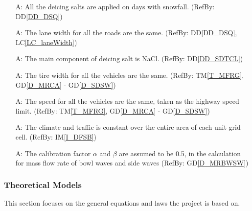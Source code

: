 \documentclass[12pt]{article}
\newcommand{\dref}[1]{GD\ref{#1}}
\newcommand{\ddref}[1]{DD\ref{#1}}
\newcommand{\tref}[1]{TM\ref{#1}}
\newcounter{assumpnum} %
\newcommand{\iref}[1]{IM\ref{#1}}
\newcommand{\lcref}[1]{LC\ref{#1}}
\begin{document}
\begin{itemize}

\item[A\refstepcounter{assumpnum}\theassumpnum \label{A_deicingSalts}:] All the deicing salts are applied on days with snowfall. (RefBy: \ddref{DD_DSQ})


\item[A\refstepcounter{assumpnum}\theassumpnum \label{A_laneWidth}:] The lane width for all the roads are the same. (RefBy: \ddref{DD_DSQ}, \lcref{LC_laneWidth})

\item[A\refstepcounter{assumpnum}\theassumpnum \label{A_NaCl}:] The main component of deicing salt is NaCl. (RefBy: \ddref{DD_SDTCL})

\item[A\refstepcounter{assumpnum}\theassumpnum \label{A_tireWidth}:] The tire width for all the vehicles are the same. (RefBy: \tref{T_MFRG},  \dref{D_MRCA} - \dref{D_SDSW})

\item[A\refstepcounter{assumpnum}\theassumpnum \label{A_Speed}:] The speed for all the vehicles are the same, taken as the highway speed limit. (RefBy: \tref{T_MFRG}, \dref{D_MRCA} - \dref{D_SDSW})

\item[A\refstepcounter{assumpnum}\theassumpnum \label{A_Data}:] The climate and traffic is constant over the entire area of each unit grid cell. (RefBy: \iref{I_DFSB})

\item[A\refstepcounter{assumpnum}\theassumpnum \label{A_Calibration}:] The calibration factor $\alpha$ and $\beta$ are assumed to be 0.5, in the calculation for mass flow rate of bowl waves and side waves (RefBy: \dref{D_MRBWSW})


\end{itemize}

\subsubsection{Theoretical Models}\label{sec_theoretical}
This section focuses on the general equations and laws the project is based on. 
\newline
\noindent
\end{document}
